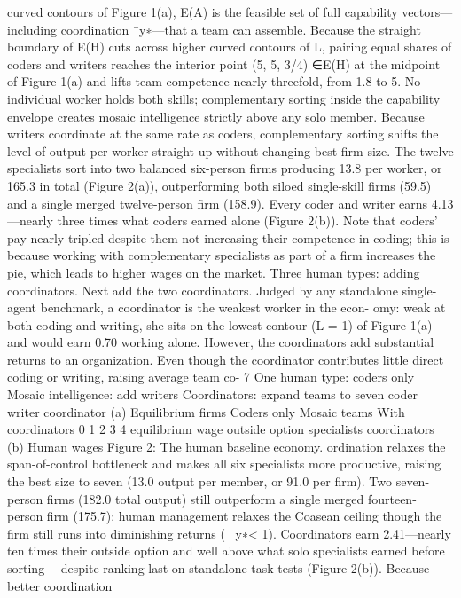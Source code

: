 curved contours of Figure 1(a), E(A) is the feasible set of full capability vectors—
including coordination ¯y∗—that a team can assemble. Because the straight boundary
of E(H) cuts across higher curved contours of L, pairing equal shares of coders and
writers reaches the interior point (5, 5, 3/4) ∈E(H) at the midpoint of Figure 1(a) and
lifts team competence nearly threefold, from 1.8 to 5. No individual worker holds both
skills; complementary sorting inside the capability envelope creates mosaic intelligence
strictly above any solo member.
Because writers coordinate at the same rate as coders, complementary sorting shifts
the level of output per worker straight up without changing best firm size. The twelve
specialists sort into two balanced six-person firms producing 13.8 per worker, or 165.3
in total (Figure 2(a)), outperforming both siloed single-skill firms (59.5) and a single
merged twelve-person firm (158.9). Every coder and writer earns 4.13—nearly three
times what coders earned alone (Figure 2(b)). Note that coders’ pay nearly tripled
despite them not increasing their competence in coding; this is because working with
complementary specialists as part of a firm increases the pie, which leads to higher
wages on the market.
Three human types: adding coordinators. Next add the two coordinators. Judged by any
standalone single-agent benchmark, a coordinator is the weakest worker in the econ-
omy: weak at both coding and writing, she sits on the lowest contour (L = 1) of
Figure 1(a) and would earn 0.70 working alone.
However, the coordinators add substantial returns to an organization. Even though
the coordinator contributes little direct coding or writing, raising average team co-
7
One human type: coders only
Mosaic intelligence: add writers
Coordinators: expand teams to seven
coder
writer
coordinator
(a) Equilibrium firms
Coders
only
Mosaic
teams
With
coordinators
0
1
2
3
4
equilibrium wage
outside option
specialists
coordinators
(b) Human wages
Figure 2: The human baseline economy.
ordination relaxes the span-of-control bottleneck and makes all six specialists more
productive, raising the best size to seven (13.0 output per member, or 91.0 per firm).
Two seven-person firms (182.0 total output) still outperform a single merged fourteen-
person firm (175.7): human management relaxes the Coasean ceiling though the firm
still runs into diminishing returns ( ¯y∗< 1). Coordinators earn 2.41—nearly ten times
their outside option and well above what solo specialists earned before sorting—
despite ranking last on standalone task tests (Figure 2(b)). Because better coordination
